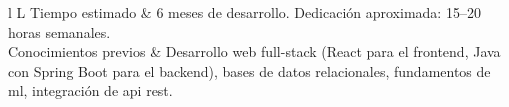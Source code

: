 \begin{table}[H]
\begin{tabularx}{\textwidth}{l L}
        Tiempo estimado & 6 meses de desarrollo. Dedicación aproximada: 15--20 horas semanales. \\
        Conocimientos previos & Desarrollo web full-stack (React para el frontend, Java con Spring Boot para el backend), bases de datos relacionales, fundamentos de \gls{ml}, integración de \gls{api} \gls{rest}. \\
        \bottomrule
    \end{tabularx}
\end{table}